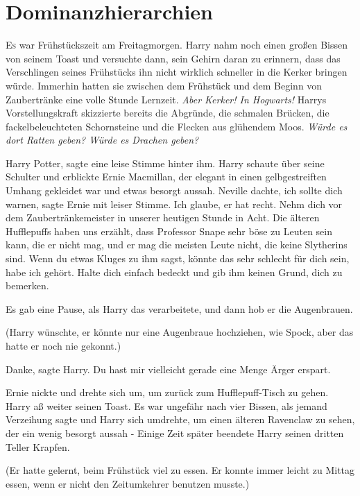 \chapter{Dominanzhierarchien}

\lettrine{E}{s} war Frühstückszeit am Freitagmorgen. Harry nahm noch einen
großen Bissen von seinem Toast und versuchte dann, sein Gehirn daran zu
erinnern, dass das Verschlingen seines Frühstücks ihn nicht wirklich schneller
in die Kerker bringen würde. Immerhin hatten sie zwischen dem Frühstück und dem
Beginn von Zaubertränke eine volle Stunde Lernzeit. \emph{Aber Kerker! In
Hogwarts!} Harrys Vorstellungskraft skizzierte bereits die Abgründe, die
schmalen Brücken, die fackelbeleuchteten Schornsteine und die Flecken aus
glühendem Moos. \emph{Würde es dort Ratten geben? Würde es Drachen geben?}

\glqq{}Harry Potter\grqq{}, sagte eine leise Stimme hinter ihm. Harry schaute
über seine Schulter und erblickte Ernie Macmillan, der elegant in einen
gelbgestreiften Umhang gekleidet war und etwas besorgt aussah. \glqq{}Neville
dachte, ich sollte dich warnen\grqq{}, sagte Ernie mit leiser Stimme. \glqq{}Ich
glaube, er hat recht. Nehm dich vor dem Zaubertränkemeister in unserer heutigen
Stunde in Acht. Die älteren Hufflepuffs haben uns erzählt, dass Professor Snape
sehr böse zu Leuten sein kann, die er nicht mag, und er mag die meisten Leute
nicht, die keine Slytherins sind. Wenn du etwas Kluges zu ihm sagst, könnte das
sehr schlecht für dich sein, habe ich gehört. Halte dich einfach bedeckt und gib
ihm keinen Grund, dich zu bemerken.\grqq{}

Es gab eine Pause, als Harry das verarbeitete, und dann hob er die Augenbrauen.

(Harry wünschte, er könnte nur eine Augenbraue hochziehen, wie Spock, aber das
hatte er noch nie gekonnt.)

\glqq{}Danke\grqq{}, sagte Harry. \glqq{}Du hast mir vielleicht gerade eine Menge
Ärger erspart.\grqq{}

Ernie nickte und drehte sich um, um zurück zum Hufflepuff-Tisch zu gehen. Harry
aß weiter seinen Toast. Es war ungefähr nach vier Bissen, als jemand \glqq{}
Verzeihung\grqq{} sagte und Harry sich umdrehte, um einen älteren Ravenclaw zu
sehen, der ein wenig besorgt aussah - Einige Zeit später beendete Harry seinen
dritten Teller Krapfen.

(Er hatte gelernt, beim Frühstück viel zu essen. Er konnte immer leicht zu
Mittag essen, wenn er nicht den Zeitumkehrer benutzen musste.)

